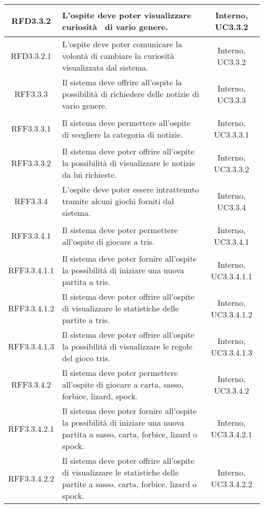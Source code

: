 \begin{longtable}{|c|>{\centering}m{7cm}|c|}
	\hypertarget{RFD3.3.2}{RFD3.3.2} & L'ospite deve poter visualizzare curiosità  di vario genere. & Interno, UC3.3.2\\ \hline
	\hypertarget{RFD3.3.2.1}{RFD3.3.2.1} & L'ospite deve poter comunicare la volontà di cambiare la curiosità visualizzata dal sistema. & Interno, UC3.3.2\\ \hline
	\hypertarget{RFF3.3.3}{RFF3.3.3} & Il sistema deve offrire all'ospite la possibilità di richiedere delle notizie di vario genere. & Interno, UC3.3.3\\ \hline
	\hypertarget{RFF3.3.3.1}{RFF3.3.3.1} & Il sistema deve permettere all'ospite di scegliere la categoria di notizie. & Interno, UC3.3.3.1\\ \hline
	\hypertarget{RFF3.3.3.2}{RFF3.3.3.2} & Il sistema deve poter offrire all'ospite la possibilità di visualizzare le notizie da lui richieste. & Interno, UC3.3.3.2\\ \hline
	\hypertarget{RFF3.3.4}{RFF3.3.4} & L'ospite deve poter essere intrattenuto tramite alcuni giochi forniti dal sistema. & Interno, UC3.3.4\\ \hline
	\hypertarget{RFF3.3.4.1}{RFF3.3.4.1} & Il sistema deve poter permettere all'ospite di giocare a tris. & Interno, UC3.3.4.1\\ \hline
	\hypertarget{RFF3.3.4.1.1}{RFF3.3.4.1.1} & Il sistema deve poter fornire all'ospite la possibilità di iniziare una nuova partita a tris. & Interno, UC3.3.4.1.1\\ \hline
	\hypertarget{RFF3.3.4.1.2}{RFF3.3.4.1.2} & Il sistema deve poter offrire all'ospite di visualizzare le statistiche delle partite a tris. & Interno, UC3.3.4.1.2\\ \hline
	\hypertarget{RFF3.3.4.1.3}{RFF3.3.4.1.3} & Il sistema deve poter offrire all'ospite la possibilità di visualizzare le regole del gioco tris. & Interno, UC3.3.4.1.3\\ \hline
	\hypertarget{RFF3.3.4.2}{RFF3.3.4.2} & Il sistema deve poter permettere all'ospite di giocare a carta, sasso, forbice, lizard, spock. & Interno, UC3.3.4.2\\ \hline
	\hypertarget{RFF3.3.4.2.1}{RFF3.3.4.2.1} & Il sistema deve poter fornire all'ospite la possibilità di iniziare una nuova partita a sasso, carta, forbice, lizard o spock. & Interno, UC3.3.4.2.1\\ \hline
	\hypertarget{RFF3.3.4.2.2}{RFF3.3.4.2.2} & Il sistema deve poter offrire all'ospite di visualizzare le statistiche delle partite a sasso, carta, forbice, lizard o spock. & Interno, UC3.3.4.2.2\\ \hline

\end{longtable}
